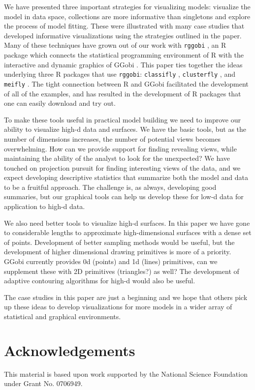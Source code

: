\documentclass[preprint]{imsart}
\begin{document}
We have presented three important strategies for visualizing models: visualize the model in data space, collections are more informative than singletons and explore the process of model fitting.  These were illustrated with many case studies that developed informative visualizations using the strategies outlined in the paper.  Many of these techniques have grown out of our work with {\tt rggobi} \citep{rggobi}, an R package which connects the statistical programming environment of R \citep{r} with the interactive and dynamic graphics of GGobi  \citep{swayne:2003}. This paper ties together the ideas underlying three R packages that use {\tt rggobi}: {\tt classifly} \citep{classifly}, {\tt clusterfly} \citep{clusterfly}, and {\tt meifly} \citep{meifly}.  The tight connection between R and GGobi facilitated the development of all of the examples, and has resulted in the development of R packages that one can easily download and try out.

To make these tools useful in practical model building we need to improve our ability to visualize high-d data and surfaces.  We have the basic tools, but as the number of dimensions increases, the number of potential views becomes overwhelming.  How can we provide support for finding revealing views, while maintaining the ability of the analyst to look for the unexpected?  We have touched on projection pursuit for finding interesting views of the data, and we expect developing descriptive statistics that summarize both the model and data to be a fruitful approach.  The challenge is, as always, developing good summaries, but our graphical tools can help us develop these for low-d data for application to high-d data.

We also need better tools to visualize high-d surfaces.  In this paper we have gone to considerable lengths to approximate high-dimensional surfaces with a dense set of points.  Development of better sampling methods would be useful, but the development of higher dimensional drawing primitives is more of a priority.   GGobi currently provides 0d (points) and 1d (lines) primitives, can we supplement these with 2D primitives (triangles?) as well?  The development of adaptive contouring algorithms for high-d would also be useful.

The case studies in this paper are just a beginning and we hope that others pick up these ideas to develop visualizations for more models in a wider array of statistical and graphical environments.

\section{Acknowledgements}

This material is based upon work supported by the National Science Foundation under Grant No. 0706949.




\end{document}
